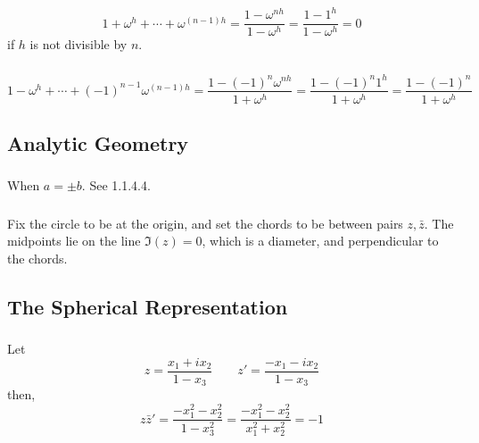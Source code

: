 \subsubsection{}
\subsubsection{}
\[1+\omega^h+\cdots+\omega^{(n-1)h} = \frac{1-\omega^{nh}}{1-\omega^h}=\frac{1-1^h}{1-\omega^h}=0\]
if \(h\) is not divisible by \(n\).
\subsubsection{}
\[1-\omega^h+\cdots+(-1)^{n-1}\omega^{(n-1)h} = \frac{1-(-1)^n\omega^{nh}}{1+\omega^h}=\frac{1-(-1)^n1^h}{1+\omega^h}=\frac{1-(-1)^{n}}{1+\omega^h}\]
\subsection{Analytic Geometry}
\subsubsection{}
When \(a=\pm b\). See 1.1.4.4.
\subsubsection{}
\subsubsection{}
\subsubsection{}
Fix the circle to be at the origin, and set the chords to be between pairs \(z,\bar z\). The midpoints lie on the line \(\Im(z) =0\), which is a diameter, and perpendicular to the chords.
\subsubsection{}
\subsection{The Spherical Representation}
\subsubsection{}
Let
\[z = \frac{x_1+ix_2}{1-x_3}\qquad z' = \frac{-x_1-ix_2}{1-x_3}\]
then,
\[z\bar z' = \frac{-x_1^2-x_2^2}{1-x_3^2}=\frac{-x_1^2-x_2^2}{x_1^2+x_2^2} = -1\]
\subsubsection{}
\subsubsection{}
\subsubsection{}
\subsubsection{}
